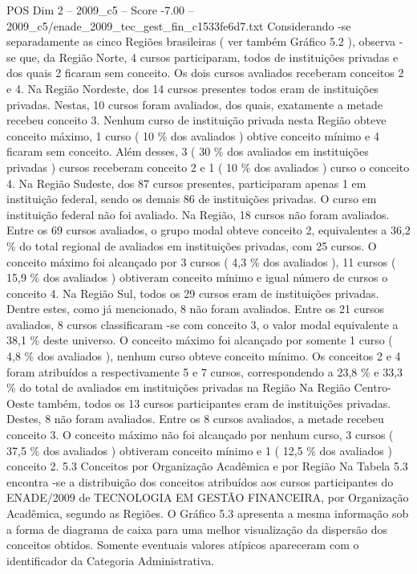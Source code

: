 \begin{textsample}{POS Dim 2 – 2009\_c5 – Score -7.00 – 2009\_c5/enade\_2009\_tec\_gest\_fin\_c1533fe6d7.txt}
Considerando -se separadamente as cinco Regiões brasileiras ( ver também Gráfico 5.2 ), observa -se que, da Região Norte, 4 cursos participaram, todos de instituições privadas e dos quais 2 ficaram sem conceito.
Os dois cursos avaliados receberam conceitos 2 e 4.
Na Região Nordeste, dos 14 cursos presentes todos eram de instituições privadas.
Nestas, 10 cursos foram avaliados, dos quais, exatamente a metade recebeu conceito 3.
Nenhum curso de instituição privada nesta Região obteve conceito máximo, 1 curso ( 10 \% dos avaliados ) obtive conceito mínimo e 4 ficaram sem conceito.
Além desses, 3 ( 30 \% dos avaliados em instituições privadas ) cursos receberam conceito 2 e 1 ( 10 \% dos avaliados ) curso o conceito 4.
Na Região Sudeste, dos 87 cursos presentes, participaram apenas 1 em instituição federal, sendo os demais 86 de instituições privadas.
O curso em instituição federal não foi avaliado.
Na Região, 18 cursos não foram avaliados.
Entre os 69 cursos avaliados, o grupo modal obteve conceito 2, equivalentes a 36,2 \% do total regional de avaliados em instituições privadas, com 25 cursos.
O conceito máximo foi alcançado por 3 cursos ( 4,3 \% dos avaliados ), 11 cursos ( 15,9 \% dos avaliados ) obtiveram conceito mínimo e igual número de cursos o conceito 4.
Na Região Sul, todos os 29 cursos eram de instituições privadas.
Dentre estes, como já mencionado, 8 não foram avaliados.
Entre os 21 cursos avaliados, 8 cursos classificaram -se com conceito 3, o valor modal equivalente a 38,1 \% deste universo.
O conceito máximo foi alcançado por somente 1 curso ( 4,8 \% dos avaliados ), nenhum curso obteve conceito mínimo.
Os conceitos 2 e 4 foram atribuídos a respectivamente 5 e 7 cursos, correspondendo a 23,8 \% e 33,3 \% do total de avaliados em instituições privadas na Região Na Região Centro-Oeste também, todos os 13 cursos participantes eram de instituições privadas.
Destes, 8 não foram avaliados.
Entre os 8 cursos avaliados, a metade recebeu conceito 3.
O conceito máximo não foi alcançado por nenhum curso, 3 cursos ( 37,5 \% dos avaliados ) obtiveram conceito mínimo e 1 ( 12,5 \% dos avaliados ) conceito 2. 5.3 Conceitos por Organização Acadêmica e por Região Na Tabela 5.3 encontra -se a distribuição dos conceitos atribuídos aos cursos participantes do ENADE/2009 de TECNOLOGIA EM GESTÃO FINANCEIRA, por Organização Acadêmica, segundo as Regiões.
O Gráfico 5.3 apresenta a mesma informação sob a forma de diagrama de caixa para uma melhor visualização da dispersão dos conceitos obtidos.
Somente eventuais valores atípicos apareceram com o identificador da Categoria Administrativa.

\end{textsample}
